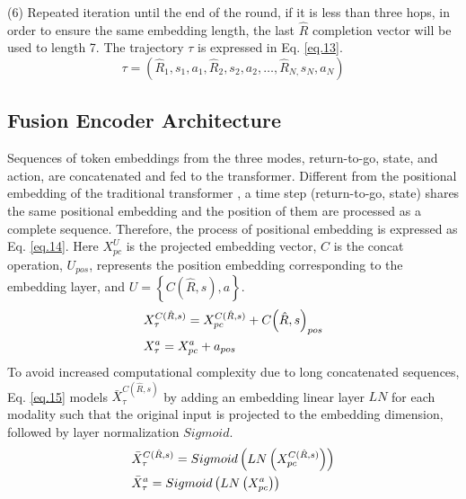 \documentclass[10pt,journal,compsoc]{IEEEtran}
\begin{document}
(6) Repeated iteration until the end of the round, if it is less than three hops, in order to ensure the same embedding length, the last $\hat{R}$ completion vector will be used to length 7. The trajectory $\tau$ is expressed in Eq. \ref{eq.13}.
\begin{equation}\label{eq.13}
\tau=\left( {{{\hat R}_1},{s_1},{a_1},{{\hat R}_2},{s_2},{a_2 }, \ldots ,{{\hat R }_{N,}}{s_N},{a_N}} \right)
\end{equation} 

\subsection{Fusion Encoder Architecture}\label{p3}
Sequences of token embeddings from the three modes, return-to-go, state, and action, are concatenated and fed to the transformer. Different from the positional embedding of the traditional transformer \cite{ref50}, a time step (return-to-go, state) shares the same positional embedding and the position of them are processed as a complete sequence. Therefore, the process of positional embedding is expressed as Eq. \ref{eq.14}. Here $X^U_{pc}$ is the projected embedding vector, $C$ is the concat operation, $U_{pos}$, represents the position embedding corresponding to the embedding layer, and $U = \left\{ {C\left( {\hat R,s} \right),a} \right\}$.
\begin{equation}\label{eq.14}
\begin{gathered}
  X_\tau^{C(\hat R,s)} = X_{pc}^{C(\hat R,s)} + C{\left( {\hat R,s} \right)_{pos}} \hfill \\
  X_\tau^a = {X^a_{pc}} + {a_{pos}} \hfill \\ 
\end{gathered} 
\end{equation}
To avoid increased computational complexity due to long concatenated sequences, Eq. \ref{eq.15} models $\bar X_\tau^{C(\hat R,s)}$ by adding an embedding linear layer $LN$ for each modality such that the original input is projected to the embedding dimension, followed by layer normalization $Sigmoid$.
\begin{equation}\label{eq.15}
\begin{gathered}
  \bar X_\tau^{C(\hat R,s)} = Sigmoid\left( {LN\left( {X_{pc}^{C(\hat R,s)}} \right)} \right) \hfill \\
  \bar X_\tau^a = Sigmoid\left( {LN\left( {X_{pc}^a} \right)} \right) \hfill \\ 
\end{gathered} 
\end{equation}
\end{document}
